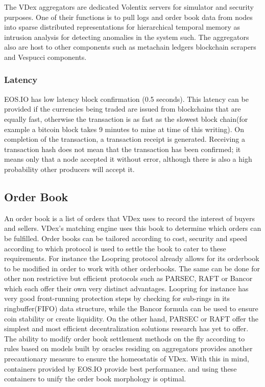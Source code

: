 \documentclass[]{article}
\begin{document}
{	The VDex aggregators are dedicated Volentix servers for simulator and security purposes. 
	One of their functions is to pull logs and order book data from nodes into sparse distributed representations for hierarchical temporal memory as intrusion \cite{24} analysis for detecting anomalies in the system such. The aggregators also are host to other components such as metachain ledgers\cite{20} blockchain scrapers and Vespucci components.
	 
	
	\subsubsection{Latency}	
	EOS.IO has low latency block confirmation (0.5 seconds).\cite{3}
	This latency can be provided if the currencies being traded are issued from blockchains that are equally fast, otherwise the transaction is as fast as the slowest block chain(for example a bitcoin block takes 9 minutes to mine at time of this writing). 
	On completion of the transaction, a transaction receipt is generated. 
	Receiving a transaction hash does not mean that the transaction has been confirmed; it means only that a node accepted it without error, although there is also a high probability other producers will accept it. 

\subsection{Order Book}
An order book is a list of orders that VDex uses to record the interest of buyers and sellers. 
VDex's matching engine uses this book to determine which orders can be fulfilled.
Order books can be tailored according to cost, security and speed according to which protocol is used to settle the book to cater to these requirements. For instance the Loopring protocol already allows for its orderbook to be modified in order to work with other orderbooks.\cite{7} The same can be done for other non restrictive but efficient protocols such as PARSEC, RAFT or Bancor which each offer their own very distinct advantages. Loopring for instance has very good front-running protection steps by checking for sub-rings in its ringbuffer(FIFO) data structure, while the Bancor formula can be used to ensure coin stability or create liquidity. On the other hand, PARSEC or RAFT offer the simplest and most efficient decentralization solutions research has yet to offer.
The ability to modify order book settlement methods on the fly according to rules based on models built by oracles residing on aggregators provides another precautionary measure to ensure the homeostatis of VDex.
With this in mind, containers provided by EOS.IO provide best performance.\cite{25} and
using these containers to unify the order book morphology is optimal.


}
\end{document}
